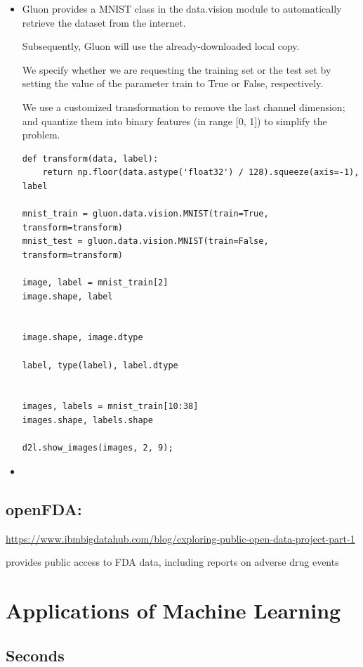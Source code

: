 \begin{itemize}
  \item  Gluon provides a MNIST class in the data.vision module to automatically retrieve the dataset from the internet. 

Subsequently, Gluon will use the already-downloaded local copy. 

We specify whether we are requesting the training set or the test set by setting
the value of the parameter train to True or False, respectively.

We use a customized transformation to remove the last channel dimension; and
quantize them into binary features (in range [0, 1]) to simplify the problem.
 
\begin{lstlisting}
def transform(data, label):
    return np.floor(data.astype('float32') / 128).squeeze(axis=-1), label

mnist_train = gluon.data.vision.MNIST(train=True, transform=transform)
mnist_test = gluon.data.vision.MNIST(train=False, transform=transform)

image, label = mnist_train[2]
image.shape, label


image.shape, image.dtype

label, type(label), label.dtype


images, labels = mnist_train[10:38]
images.shape, labels.shape

d2l.show_images(images, 2, 9);
\end{lstlisting}



  \item 
\end{itemize}


\section{openFDA: }

\url{https://www.ibmbigdatahub.com/blog/exploring-public-open-data-project-part-1}

provides public access to FDA data, including reports on adverse drug events


\chapter{Applications of Machine Learning}
\label{sec:application-machine-learning}

\section{Seconds}

